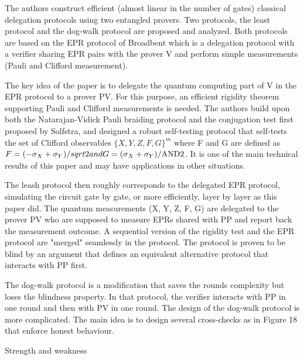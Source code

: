 \documentclass[12pt]{article}
\newcommand{\AND}{\mbox{\rm AND}}
\begin{document}
The authors construct efficient (almost linear in the number of gates) classical delegation protocols using two entangled provers. Two protocols, the least protocol and the dog-walk protocol are proposed and analyzed. Both protocols are based on the EPR protocol of Broadbent which is a delegation protocol with a verifier sharing EPR pairs with the prover V and perform simple measurements (Pauli and Clifford measurement).

The key idea of the paper is to delegate the quantum computing part of V in the EPR protocol to a prover PV. For this purpose, an efficient rigidity theorem supporting Pauli and Clifford measurements is needed. The authors build upon both the Natarajan-Vidick Pauli braiding protocol and the conjugation test first proposed by Solfstra, and designed a robust self-testing protocol that self-tests the set of Clifford observables $\{X,Y,Z,F,G\}^m$ where F and G are defined as $F = (-\sigma_X+\sigma_Y)/sqrt{2} and G = (\sigma_X + \sigma_Y)/\AND{2}$. It is one of the main technical results of this paper and may have applications in other situations.

The leash protocol then roughly corresponds to the delegated EPR protocol, simulating the circuit gate by gate, or more efficiently, layer by layer as this paper did. The quantum measurements (X, Y, Z, F, G) are delegated to the prover PV who are supposed to measure EPRs shared with PP and report back the measurement outcome. A sequential version of the rigidity test and the EPR protocol are "merged" seamlessly in the protocol. The protocol is proven to be blind by an argument that defines an equivalent alternative protocol that interacts with PP first.

The dog-walk protocol is a modification that saves the rounds complexity but loses the blindness property. In that protocol, the verifier interacts with PP in one round and then with PV in one round. The design of the dog-walk protocol is more complicated. The main idea is to design several cross-checks as in Figure 18 that enforce honest behaviour.

Strength and weakness
\end{document}
